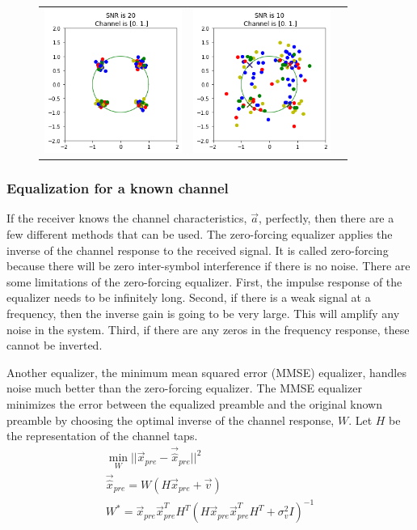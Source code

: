 \begin{figure}
\begin{tabular}{ccc}
    \includegraphics[width=45mm]{figures/equal_intro/snr_20_c5/cfo_0.png}&
    \includegraphics[width=45mm]{figures/equal_intro/snr_10_c5/cfo_0.png}\\
  \end{tabular}
  \label{fig:multi_tap}
\end{figure}

\subsubsection{Equalization for a known channel}

If the receiver knows the channel characteristics, $\vec{a}$, perfectly, then there are a few different methods that can be used.  
The zero-forcing equalizer applies the inverse of the channel response to the received signal.  It is called zero-forcing because there will be zero inter-symbol interference if there is no noise.
There are some limitations of the zero-forcing equalizer. 
First, the impulse response of the equalizer needs to be infinitely long. 
Second, if there is a weak signal at a frequency, then the inverse gain is going to be very large.  This will amplify any noise in the system. 
Third, if there are any zeros in the frequency response, these cannot be inverted.

Another equalizer, the minimum mean squared error (MMSE) equalizer, handles noise much better than the zero-forcing equalizer.
The MMSE equalizer minimizes the error between the equalized preamble and the original known preamble by choosing the optimal inverse of the channel response, $W$.  Let $H$ be the representation of the channel taps.
\begin{align}
\min_W||\vec{x}_{pre}-\vec{\hat{x}}_{pre}||^2 \\
\vec{\hat{x}}_{pre} = W (H\vec{x}_{pre}+\vec{v}) \\
W^* = \vec{x}_{pre} \vec{x}_{pre}^T H^T (H \vec{x}_{pre} \vec{x}_{pre}^T H^T + \sigma_v^2 I)^{-1}
\end{align}

